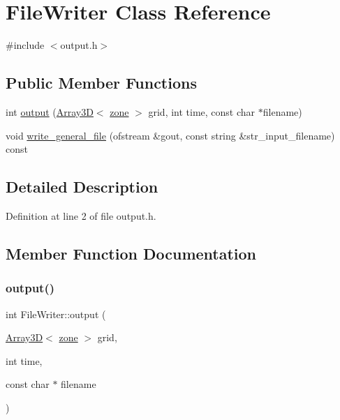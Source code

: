 \hypertarget{classFileWriter}{}\section{File\+Writer Class Reference}
\label{classFileWriter}


{\ttfamily \#include $<$output.\+h$>$}

\subsection*{Public Member Functions}
\begin{DoxyCompactItemize}
\item 
int \hyperlink{classFileWriter_a0a73a6ca55ceed513a4e9eeea22a2ab1}{output} (\hyperlink{classTNT_1_1Array3D}{Array3D}$<$ \hyperlink{structzone}{zone} $>$ grid, int time, const char $\ast$filename)
\item 
void \hyperlink{classFileWriter_afb93486e0ae9be60cb67b291d78e0c0b}{write\+\_\+general\+\_\+file} (ofstream \&gout, const string \&str\+\_\+input\+\_\+filename) const
\end{DoxyCompactItemize}


\subsection{Detailed Description}


Definition at line 2 of file output.\+h.



\subsection{Member Function Documentation}
\mbox{\label{classFileWriter_a0a73a6ca55ceed513a4e9eeea22a2ab1}} 
\subsubsection{\texorpdfstring{output()}{output()}}
{\footnotesize\ttfamily int File\+Writer\+::output (\begin{DoxyParamCaption}\item[{\hyperlink{classTNT_1_1Array3D}{Array3D}$<$ \hyperlink{structzone}{zone} $>$}]{grid,  }\item[{int}]{time,  }\item[{const char $\ast$}]{filename }\end{DoxyParamCaption})}

